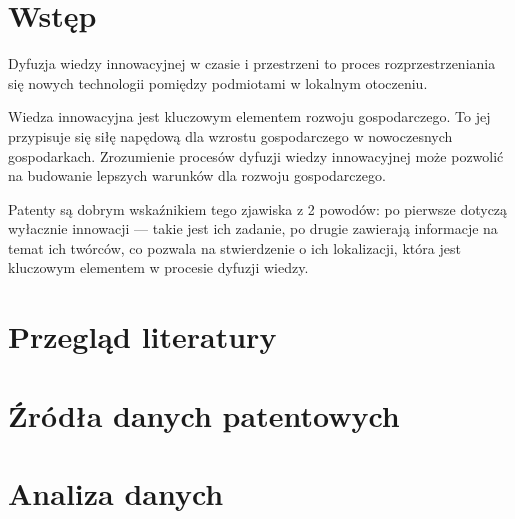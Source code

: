 \documentclass[12pt, withmarginpar]{mwbk}
\begin{document}


\tableofcontents

\chapter*{Wstęp}

Dyfuzja wiedzy innowacyjnej w czasie i przestrzeni to proces
rozprzestrzeniania się nowych technologii pomiędzy podmiotami
w lokalnym otoczeniu.

Wiedza innowacyjna jest kluczowym elementem rozwoju gospodarczego.
To jej przypisuje się siłę napędową dla wzrostu gospodarczego
w nowoczesnych gospodarkach. Zrozumienie procesów dyfuzji 
wiedzy innowacyjnej może pozwolić na budowanie lepszych 
warunków dla rozwoju gospodarczego.

Patenty są dobrym wskaźnikiem tego zjawiska z 2 powodów:
po pierwsze dotyczą wyłacznie innowacji --- takie jest ich zadanie,
po drugie zawierają informacje na temat ich twórców, co pozwala
na stwierdzenie o ich lokalizacji, która jest kluczowym elementem
w procesie dyfuzji wiedzy.


\chapter{Przegląd literatury}\label{ch:intro}



\chapter{Źródła danych patentowych}\label{ch:data}











\chapter{Analiza danych}







\listoffigures

\listoftables
\end{document}
